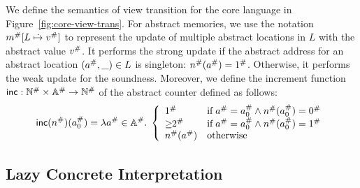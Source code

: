 We define the semantics of view transition for the core language in
Figure~\ref{fig:core-view-trans}.  For abstract memories, we use the notation
${m}^{\#}[L \;\dot{\mapsto}\; {v}^{\#}]$ to represent the update of multiple abstract
locations in $L$ with the abstract value ${v}^{\#}$.  It performs the strong
update if the abstract address for an abstract location $({a}^{\#}, \_) \in L$
is singleton: ${n}^{\#}({a}^{\#}) = {1}^{\#}$.  Otherwise, it performs the weak
update for the soundness.  Moreover, we define the increment function $\textsf{inc}:
{\mathbb{N}}^{\#} \times {\mathbb{A}}^{\#} \rightarrow {\mathbb{N}}^{\#}$ of the abstract counter
defined as follows:
\[
  \textsf{inc}({n}^{\#})({a}^{\#}_0) = \lambda {a}^{\#} \in {\mathbb{A}}^{\#}. \; \left\{
    \begin{array}{ll}
      {1}^{\#} & \text{if} \; {a}^{\#} = {a}^{\#}_0 \wedge
      {n}^{\#}({a}^{\#}_0) = {0}^{\#}\\
      {\geq\!\!2}^{\#} & \text{if} \; {a}^{\#} = {a}^{\#}_0 \wedge
      {n}^{\#}({a}^{\#}_0) = {1}^{\#}\\
      {n}^{\#}({a}^{\#}) & \text{otherwise}
    \end{array}
  \right.
\]


\subsection{Lazy Concrete Interpretation}

